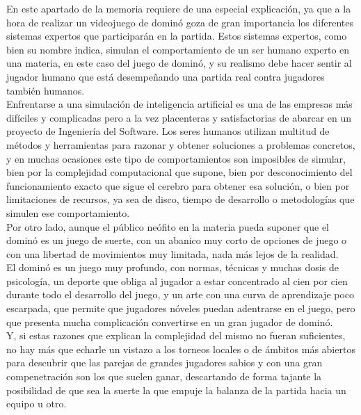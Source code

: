 En este apartado de la memoria requiere de una especial explicación, ya que a la hora de realizar un videojuego de
dominó goza de gran importancia los diferentes sistemas expertos que participarán en la partida. Estos sistemas expertos,
como bien su nombre indica, simulan el comportamiento de un ser humano experto en una materia, en este caso del juego
de dominó, y su realismo debe hacer sentir al jugador humano que está desempeñando una partida real contra jugadores
también humanos. \\

Enfrentarse a una simulación de inteligencia artificial es una de las empresas más difíciles y complicadas pero a la
vez placenteras y satisfactorias de abarcar en un proyecto de Ingeniería del Software. Los seres humanos utilizan
multitud de métodos y herramientas para razonar y obtener soluciones a problemas concretos, y en muchas ocasiones
este tipo de comportamientos son imposibles de simular, bien por la complejidad computacional que supone, bien por
desconocimiento del funcionamiento exacto que sigue el cerebro para obtener esa solución, o bien por limitaciones de
recursos, ya sea de disco, tiempo de desarrollo o metodologías que simulen ese comportamiento. \\

Por otro lado, aunque el público neófito en la materia pueda suponer que el dominó es un juego de suerte, con un
abanico muy corto de opciones de juego o con una libertad de movimientos muy limitada, nada más lejos de la realidad. \\

El dominó es un juego muy profundo, con normas, técnicas y muchas dosis de psicología, un deporte que obliga al
jugador a estar concentrado al cien por cien durante todo el desarrollo del juego, y un arte con una curva de
aprendizaje poco escarpada, que permite que jugadores nóveles puedan adentrarse en el juego, pero que presenta
mucha complicación convertirse en un gran jugador de dominó. \\

Y, si estas razones que explican la complejidad del mismo no fueran suficientes, no hay más que echarle un vistazo
a los torneos locales o de ámbitos más abiertos para descubrir que las parejas de grandes jugadores sabios y con
una gran compenetración son los que suelen ganar, descartando de forma tajante la posibilidad de que sea la suerte
la que empuje la balanza de la partida hacia un equipo u otro. \\

